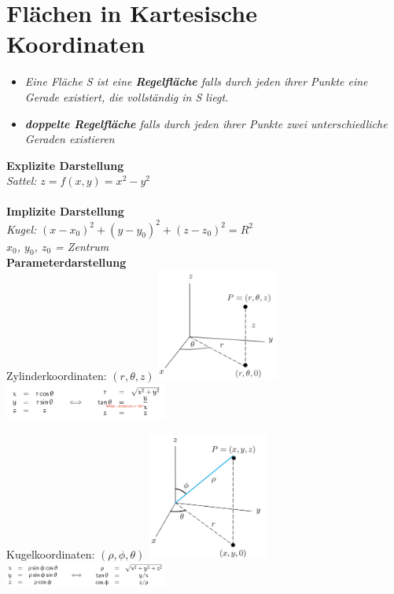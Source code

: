 \section{Flächen in Kartesische Koordinaten}

\begin{itemize}
    \item\textit{Eine Fläche S ist eine \textbf{Regelfläche} falls durch jeden ihrer Punkte eine Gerade existiert, die vollständig in S liegt.}
    \item\textit{\textbf{doppelte Regelfläche} falls durch jeden ihrer Punkte zwei unterschiedliche Geraden existieren}
\end{itemize}



\textbf{Explizite Darstellung} \\
\textit{Sattel:}
$z = f(x,y) = x^2 - y^2$ \\
\\
\textbf{Implizite Darstellung} \\
\textit{Kugel:}
$(x-x_0)^2 + (y-y_0)^2 + (z-z_0)^2 = R^2$ \\
\textit{$x_0$, $y_0$, $z_0$ = Zentrum}
\\
\textbf{Parameterdarstellung} \\

Zylinderkoordinaten:
\textit{$(r,\theta,z)$}
\includegraphics[width=0.3\textwidth]{assets/Zylinderkoordinaten.png}
\includegraphics[width=0.4\textwidth]{assets/ZylinderkoordinatenUmrechnnung.png}

Kugelkoordinaten:
\textit{$(\rho,\phi,\theta)$}
\includegraphics[width=0.3\textwidth]{assets/Kugelkoordinaten.png}
\includegraphics[width=0.4\textwidth]{assets/KugelkoordinatenUmrechnung.png}

